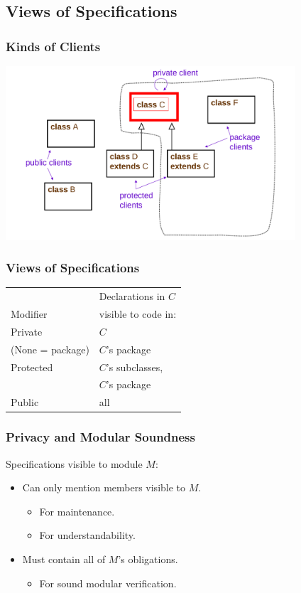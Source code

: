 \subsection[Views]{Views of Specifications}

\begin{frame}
\frametitle{Kinds of Clients}
\includegraphics[width=4.25in]{visibility-modifiers}
\end{frame}

\begin{frame}
\frametitle{Views of Specifications}
\begin{tabular}{ll}
         & Declarations in $C$ \\
Modifier & visible to code in: \\
\hline
Private          & $C$ \\
(None = package) & $C$'s package \\
Protected        & $C$'s subclasses, \\
                 & $C$'s package \\
Public           & all
\end{tabular}
\end{frame}

\begin{frame}
\frametitle{Privacy and Modular Soundness}
Specifications visible to module $M$:
\begin{itemize}
\item
Can only mention members visible to $M$.
\begin{itemize}
\item
For maintenance.

\item
For understandability.
\end{itemize}

\item
Must contain all of $M$'s obligations.
\begin{itemize}
\item
For sound modular verification.
\end{itemize}
\end{itemize}
\end{frame}

